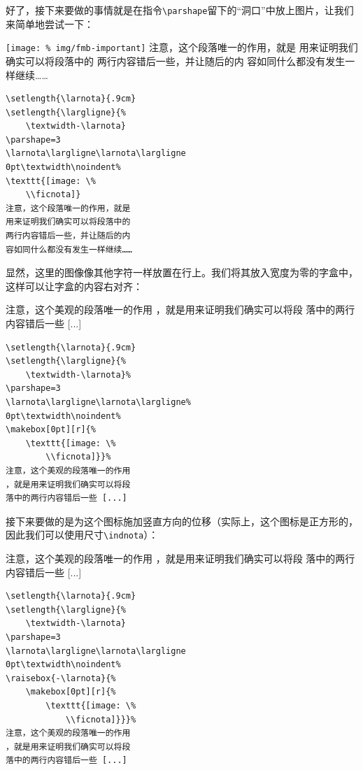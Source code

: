 好了，接下来要做的事情就是在指令\verb|\parshape|留下的“洞口”中放上图片，让我们来简单地尝试一下：

\begin{codelist}[11.7]{
\setlength{\larnota}{.9cm}
\setlength{\largligne}{%
    \textwidth-\larnota}
\larnota\largligne\larnota\largligne
0pt\textwidth\noindent%
\texttt{[image: \%
img/fmb-important]}
注意，这个段落唯一的作用，就是
用来证明我们确实可以将段落中的
两行内容错后一些，并让随后的内
容如同什么都没有发生一样继续……
}
\begin{verbatim}
\setlength{\larnota}{.9cm}
\setlength{\largligne}{%
    \textwidth-\larnota}
\parshape=3
\larnota\largligne\larnota\largligne
0pt\textwidth\noindent%
\texttt{[image: \%
    \\ficnota]}
注意，这个段落唯一的作用，就是
用来证明我们确实可以将段落中的
两行内容错后一些，并让随后的内
容如同什么都没有发生一样继续……\end{verbatim}
\end{codelist}

显然，这里的图像像其他字符一样放置在行上。我们将其放入宽度为零的字盒中，这样可以让字盒的内容右对齐：

\begin{codelist}[11.7]{
\setlength{\larnota}{.9cm}
\setlength{\largligne}{%
    \textwidth-\larnota}%
\larnota\largligne\larnota\largligne%
0pt\textwidth\noindent%
%
注意，这个美观的段落唯一的作用
，就是用来证明我们确实可以将段
落中的两行内容错后一些 [...]
}
\begin{verbatim}
\setlength{\larnota}{.9cm}
\setlength{\largligne}{%
    \textwidth-\larnota}%
\parshape=3
\larnota\largligne\larnota\largligne%
0pt\textwidth\noindent%
\makebox[0pt][r]{%
    \texttt{[image: \%
        \\ficnota]}}%
注意，这个美观的段落唯一的作用
，就是用来证明我们确实可以将段
落中的两行内容错后一些 [...]\end{verbatim}
\end{codelist}

接下来要做的是为这个图标施加竖直方向的位移（实际上，这个图标是正方形的，因此我们可以使用尺寸\verb|\indnota|）：

\begin{codelist}[11.9]{
\setlength{\larnota}{.9cm}
\setlength{\largligne}{%
    \textwidth-\larnota}
\larnota\largligne\larnota\largligne
0pt\textwidth\noindent%
%
注意，这个美观的段落唯一的作用
，就是用来证明我们确实可以将段
落中的两行内容错后一些 [...]
}
\begin{verbatim}
\setlength{\larnota}{.9cm}
\setlength{\largligne}{%
    \textwidth-\larnota}
\parshape=3
\larnota\largligne\larnota\largligne
0pt\textwidth\noindent%
\raisebox{-\larnota}{%
    \makebox[0pt][r]{%
        \texttt{[image: \%
            \\ficnota]}}}%
注意，这个美观的段落唯一的作用
，就是用来证明我们确实可以将段
落中的两行内容错后一些 [...]\end{verbatim}
\end{codelist}

